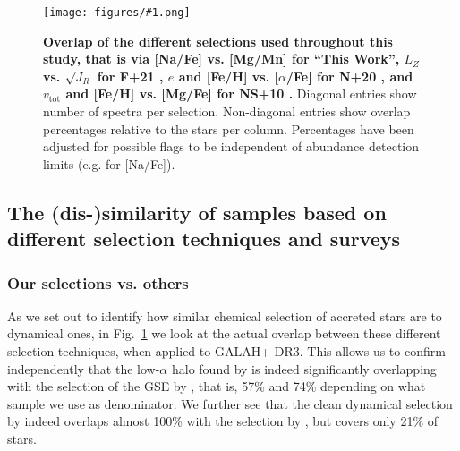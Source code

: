 \documentclass[fleqn,usenatbib]{mnras}
\newcommand{\codeicon}{{\faCloudDownload}}
\newcommand{\codelink}[1]{\href{https://github.com/svenbuder/Accreted-stars-in-GALAH-DR3/tree/main/figures/#1.ipynb}{\codeicon}\,\,}
\newcommand{\oscaption}[2]{\caption{#2 \codelink{#1}}}
\newcommand{\figurecolumnwidth}[3]{\begin{figure} \centering \texttt{[image: figures/\#1.png]}\oscaption{#2}{#3}\label{fig:#1} \end{figure}}
\begin{document}
\figurecolumnwidth{selection_overlap}{chronochemodynamic_comparison}{
\textbf{Overlap of the different selections used throughout this study, that is via [Na/Fe] vs. [Mg/Mn] for ``This Work'', $L_Z$ vs. $\sqrt{J_R}$ for F+21 \citep{Feuillet2021}, $e$ and [Fe/H] vs. [$\alpha$/Fe] for N+20 \citep{Naidu2020}, and $v_\text{tot}$ and [Fe/H] vs. [Mg/Fe] for NS+10 \citep{Nissen2010}.} Diagonal entries show number of spectra per selection. Non-diagonal entries show overlap percentages relative to the stars per column. Percentages have been adjusted for possible flags to be independent of abundance detection limits (e.g. for [Na/Fe]). 
}

\subsection{The (dis-)similarity of samples based on different selection techniques and surveys} \label{sec:dissimilarity}

\subsubsection{Our selections vs. others}

As we set out to identify how similar chemical selection of accreted stars are to dynamical ones, in Fig.~\ref{fig:selection_overlap} we look at the actual overlap between these different selection techniques, when applied to GALAH+ DR3. This allows us to confirm independently that the low-$\alpha$ halo found by \citet{Nissen2010} is indeed significantly overlapping with the selection of the GSE by \citet{Naidu2020}, that is, 57\% and 74\% depending on what sample we use as denominator. We further see that the clean dynamical selection by \citet{Feuillet2021} indeed overlaps almost 100\% with the selection by \citet{Naidu2020}, but covers only 21\% of stars.
\end{document}
